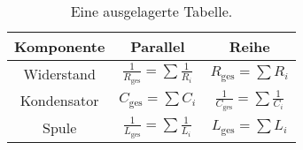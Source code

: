 \begin{table}
  \centering
    
  \begin{tabular}{|c|c|c|}
      \hline
      \rowcolor[HTML]{EFEFEF}
      \textbf{Komponente} & \textbf{Parallel} & \textbf{Reihe} \\
      \hline
      Widerstand & $\frac{1}{R_{\text{ges}}} = \sum \frac{1}{R_i}$ & $R_{\text{ges}} = \sum R_i$ \\
      \hline
      \rowcolor[HTML]{EFEFEF}
      Kondensator & $C_{\text{ges}} = \sum C_i$ & $\frac{1}{C_{\text{ges}}} = \sum \frac{1}{C_i}$ \\
      \hline
      Spule & $\frac{1}{L_{\text{ges}}} = \sum \frac{1}{L_i}$ & $L_{\text{ges}} = \sum L_i$ \\
      \hline
    \end{tabular}
  \caption{Eine ausgelagerte Tabelle.}
  \end{table}